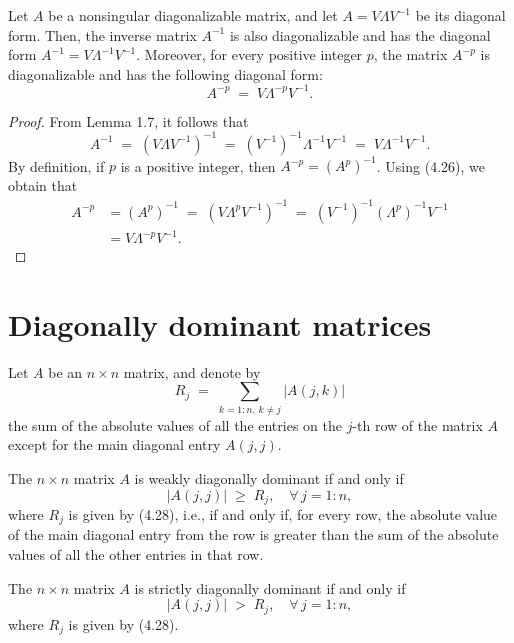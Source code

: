\begin{lemma}
Let $A$ be a nonsingular diagonalizable matrix, and let $A = V\Lambda V^{-1}$ be its
diagonal form. Then, the inverse matrix $A^{-1}$ is also diagonalizable and has the
diagonal form $A^{-1} = V\Lambda^{-1}V^{-1}$. Moreover, for every positive integer
$p$, the matrix $A^{-p}$ is diagonalizable and has the following diagonal form:
\[
A^{-p} \;=\; V\Lambda^{-p} V^{-1}.
\]
\end{lemma}

\begin{proof}
From Lemma 1.7, it follows that
\[
A^{-1} \;=\; (V\Lambda V^{-1})^{-1} \;=\; (V^{-1})^{-1}\Lambda^{-1}V^{-1} \;=\;
V\Lambda^{-1}V^{-1}.
\]
By definition, if $p$ is a positive integer, then $A^{-p} = (A^p)^{-1}$. Using
(4.26), we obtain that
\begin{align*}
A^{-p} &= (A^p)^{-1} \;=\; (V\Lambda^p V^{-1})^{-1} \;=\; (V^{-1})^{-1}(\Lambda^p)^{-1}
V^{-1}\\
&= V\Lambda^{-p}V^{-1}.
\end{align*}
\end{proof}

\section{Diagonally dominant matrices}

Let $A$ be an $n \times n$ matrix, and denote by
\begin{equation}
R_j \;=\; \sum_{k=1:n,\, k \neq j} |A(j,k)|
\end{equation}
the sum of the absolute values of all the entries on the $j$-th row of the matrix $A$
except for the main diagonal entry $A(j,j)$.

\begin{definition}
The $n \times n$ matrix $A$ is weakly diagonally dominant if and only if
\begin{equation}
|A(j,j)| \;\geq\; R_j, \quad \forall\, j = 1:n,
\end{equation}
where $R_j$ is given by (4.28), i.e., if and only if, for every row, the absolute
value of the main diagonal entry from the row is greater than the sum of the absolute
values of all the other entries in that row.
\end{definition}

\begin{definition}
The $n \times n$ matrix $A$ is strictly diagonally dominant if and only if
\begin{equation}
|A(j,j)| \;>\; R_j, \quad \forall\, j = 1:n,
\end{equation}
where $R_j$ is given by (4.28).
\end{definition}

